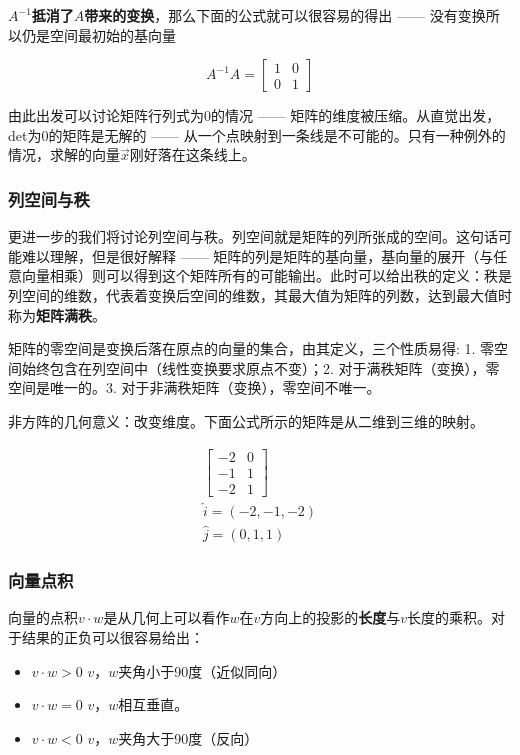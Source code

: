 \documentclass[UTF8]{ctexart}
\begin{document}
\textbf{$A^{-1}$抵消了$A$带来的变换}，那么下面的公式就可以很容易的得出 —— 没有变换所以仍是空间最初始的基向量

\begin{equation}
    A^{-1}A = \begin{bmatrix}1 & 0 \\ 0 & 1\end{bmatrix}
\end{equation}

由此出发可以讨论矩阵行列式为0的情况 —— 矩阵的维度被压缩。从直觉出发，det为0的矩阵是无解的 —— 从一个点映射到一条线是不可能的。只有一种例外的情况，求解的向量$\vec{x}$刚好落在这条线上。

\subsubsection{列空间与秩}
更进一步的我们将讨论列空间与秩。列空间就是矩阵的列所张成的空间。这句话可能难以理解，但是很好解释 —— 矩阵的列是矩阵的基向量，基向量的展开（与任意向量相乘）则可以得到这个矩阵所有的可能输出。此时可以给出秩的定义：秩是列空间的维数，代表着变换后空间的维数，其最大值为矩阵的列数，达到最大值时称为\textbf{矩阵满秩}。

矩阵的零空间是变换后落在原点的向量的集合，由其定义，三个性质易得: 1. 零空间始终包含在列空间中（线性变换要求原点不变）；2. 对于满秩矩阵（变换），零空间是唯一的。3. 对于非满秩矩阵（变换），零空间不唯一。

非方阵的几何意义：改变维度。下面公式所示的矩阵是从二维到三维的映射。

\begin{align*}
    \begin{bmatrix}
        -2 &0 \\ -1 & 1\\ -2 & 1
    \end{bmatrix} \\
    \hat{i} = (-2,-1,-2) \\
    \hat{j} = (0,1,1)
\end{align*}

\subsubsection{向量点积}
向量的点积$v\cdot w$是从几何上可以看作$w$在$v$方向上的投影的\textbf{长度}与$v$长度的乘积。对于结果的正负可以很容易给出：
\begin{itemize}
    \item $v\cdot w > 0$ $v$，$w$夹角小于90度（近似同向）
    \item $v\cdot w = 0$ $v$，$w$相互垂直。
    \item $v\cdot w < 0$ $v$，$w$夹角大于90度（反向）
\end{itemize}
\end{document}
